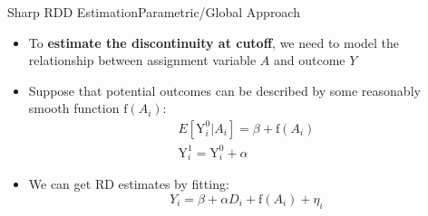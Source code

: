 \documentclass[dvipsnames,hyperref={pdfpagelabels=false}]{beamer}
\begin{document}
\begin{frame}{Sharp RDD Estimation}{Parametric/Global Approach}
	\begin{itemize}
		\item To \textbf{estimate the discontinuity at cutoff}, we need to model the relationship between assignment variable $A$ and outcome $Y$
		\vspace{0.2cm}
		\item Suppose that potential outcomes can be described by some reasonably smooth function $\mathrm{f}(A_i)$:
		\begin{align*}
		E[\mathrm{Y}^{0}_{i}|A_i]=\beta+ \mathrm{f}(A_i) \\
		\mathrm{Y}^{1}_{i} = \mathrm{Y}^{0}_{i}+\alpha
		\end{align*}
		
		\item We can get RD estimates by fitting:
		\begin{equation*}
		Y_i=\beta +\alpha D_i+\mathrm{f}(A_i)+\eta_i
		\end{equation*}
		
	\end{itemize}
\end{frame}
\end{document}
